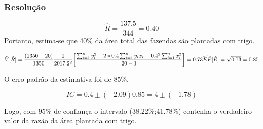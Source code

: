\documentclass[]{article}
\begin{document}
\subsubsection{Resolução}\label{resolucao-7}

\[
\hat{R}=\dfrac{137.5}{344}=0.40
\] Portanto, estima-se que 40\% da área total das fazendas são plantadas
com trigo.

\[
\hat{V}[\hat{R}]=\dfrac{(1350-20)}{1350}\dfrac{1}{2017.2^2}\bigg[\dfrac{\sum_{i=1}^ny_i^2-2*0.4\sum_{i=1}^ny_ix_i+0.4^2\sum_{i=1}^nx_i^2}{20-1}\bigg]=0.73\\
\widehat{EP}[\hat{R}]=\sqrt{0.73}=0.85
\]

O erro padrão da estimativa foi de 85\%.

\[
IC= 0.4\pm (-2.09)0.85=4\pm (-1.78)
\]

Logo, com 95\% de confiança o intervalo (38.22\%;41.78\%) contenha o
verdadeiro valor da razão da área plantada com trigo.
\end{document}

